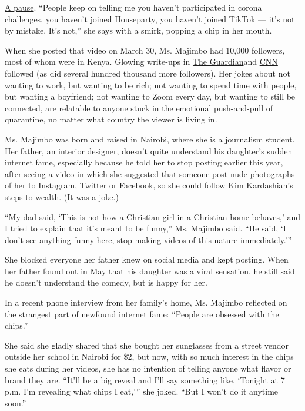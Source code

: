 \href{https://www.instagram.com/p/B-XaOKUBC_D/}{A pause}. ``People keep
on telling me you haven't participated in corona challenges, you haven't
joined Houseparty, you haven't joined TikTok --- it's not by mistake.
It's not,'' she says with a smirk, popping a chip in her mouth.

When she posted that video on March 30, Ms. Majimbo had 10,000
followers, most of whom were in Kenya. Glowing write-ups in
\href{https://www.theguardian.com/world/2020/jul/07/elsa-majimbo-the-crisp-eating-straight-talking-star-of-kenyas-covid-19-lockdown}{The
Guardian}and
\href{https://www.cnn.com/2020/08/18/africa/kenyan-comic-sensation-intl/index.html}{CNN}
followed (as did several hundred thousand more followers). Her jokes
about not wanting to work, but wanting to be rich; not wanting to spend
time with people, but wanting a boyfriend; not wanting to Zoom every
day, but wanting to still be connected, are relatable to anyone stuck in
the emotional push-and-pull of quarantine, no matter what country the
viewer is living in.

Ms. Majimbo was born and raised in Nairobi, where she is a journalism
student. Her father, an interior designer, doesn't quite understand his
daughter's sudden internet fame, especially because he told her to stop
posting earlier this year, after seeing a video in which
\href{https://www.instagram.com/p/B-m4n0QBlGy/}{she suggested that
someone} post nude photographs of her to Instagram, Twitter or Facebook,
so she could follow Kim Kardashian's steps to wealth. (It was a joke.)

``My dad said, `This is not how a Christian girl in a Christian home
behaves,' and I tried to explain that it's meant to be funny,'' Ms.
Majimbo said. ``He said, `I don't see anything funny here, stop making
videos of this nature immediately.'''

She blocked everyone her father knew on social media and kept posting.
When her father found out in May that his daughter was a viral
sensation, he still said he doesn't understand the comedy, but is happy
for her.

In a recent phone interview from her family's home, Ms. Majimbo
reflected on the strangest part of newfound internet fame: ``People are
obsessed with the chips.''

She said she gladly shared that she bought her sunglasses from a street
vendor outside her school in Nairobi for \$2, but now, with so much
interest in the chips she eats during her videos, she has no intention
of telling anyone what flavor or brand they are. ``It'll be a big reveal
and I'll say something like, `Tonight at 7 p.m. I'm revealing what chips
I eat,''' she joked. ``But I won't do it anytime soon.''

